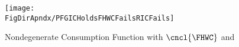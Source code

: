 \begin{figure}
\centerline{\texttt{[image: \\FigDirApndx/PFGICHoldsFHWCFailsRICFails]}}
\caption{Nondegenerate Consumption Function with $\cncl{\FHWC}$ and \cncl{\RIC}}
\label{fig:PFGICHoldsFHWCFailsRICFails}
\end{figure}
